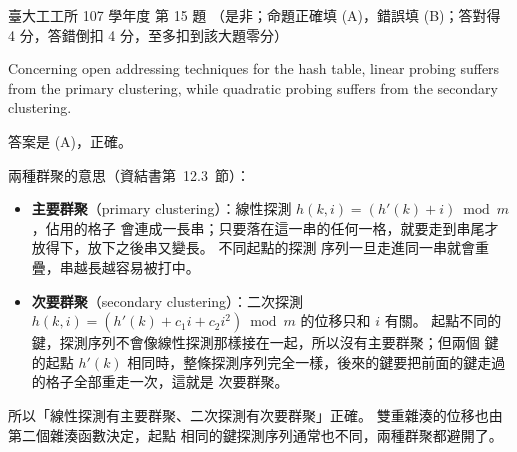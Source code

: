 \begin{pastexam}[label={px:ntu-107-ie-ds-15}]{臺大工工所 107 學年度 第 15 題}
（是非；命題正確填 (A)，錯誤填 (B)；答對得 4 分，答錯倒扣 4 分，至多扣到該大題零分）

Concerning open addressing techniques for the hash table, linear probing suffers from the primary clustering, while quadratic probing suffers from the secondary clustering.
\end{pastexam}

\begin{pastsoln}
答案是 (A)，正確。

兩種群聚的意思（資結書第~12.3~節）：
\begin{itemize}
\item \textbf{主要群聚}（primary clustering）：線性探測 $h(k, i) = (h'(k) + i) \bmod m$，佔用的格子
會連成一長串；只要落在這一串的任何一格，就要走到串尾才放得下，放下之後串又變長。 不同起點的探測
序列一旦走進同一串就會重疊，串越長越容易被打中。
\item \textbf{次要群聚}（secondary clustering）：二次探測 $h(k, i) = (h'(k) + c_1 i + c_2 i^2) \bmod m$
的位移只和 $i$ 有關。 起點不同的鍵，探測序列不會像線性探測那樣接在一起，所以沒有主要群聚；但兩個
鍵的起點 $h'(k)$ 相同時，整條探測序列完全一樣，後來的鍵要把前面的鍵走過的格子全部重走一次，這就是
次要群聚。
\end{itemize}
所以「線性探測有主要群聚、二次探測有次要群聚」正確。 雙重雜湊的位移也由第二個雜湊函數決定，起點
相同的鍵探測序列通常也不同，兩種群聚都避開了。
\end{pastsoln}
